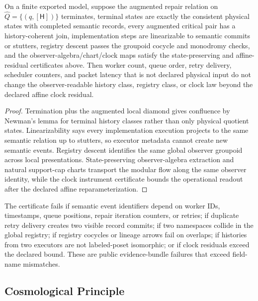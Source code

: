 \begin{theorem}\label{thm:finite-observer-clock-certificate}
On a finite exported model, suppose the augmented repair relation on
\(\widehat Q=\{(q,[\mathsf H])\}\) terminates, terminal states are exactly the consistent physical
states with completed semantic records, every augmented critical pair has a history-coherent join,
implementation steps are linearizable to semantic commits or stutters, registry descent passes the
groupoid cocycle and monodromy checks, and the observer-algebra/chart/clock maps satisfy the
state-preserving and affine-residual certificates above. Then worker count, queue order, retry
delivery, scheduler counters, and packet latency that is not declared physical input do not change
the observer-readable history class, registry class, or clock law beyond the declared affine clock
residual.
\end{theorem}

\begin{proof}
Termination plus the augmented local diamond gives confluence by Newman's lemma for terminal
history classes rather than only physical quotient states. Linearizability says every
implementation execution projects to the same semantic relation up to stutters, so executor
metadata cannot create new semantic events. Registry descent identifies the same global observer
groupoid across local presentations. State-preserving observer-algebra extraction and natural
support-cap charts transport the modular flow along the same observer identity, while the clock
instrument certificate bounds the operational readout after the declared affine reparameterization.
\end{proof}

\begin{remark}[Falsifiers]\label{rem:observer-clock-falsifiers}
The certificate fails if semantic event identifiers depend on worker IDs, timestamps, queue
positions, repair iteration counters, or retries; if duplicate retry delivery creates two visible
record commits; if two namespaces collide in the global registry; if registry cocycles or lineage
arrows fail on overlaps; if histories from two executors are not labeled-poset isomorphic; or if
clock residuals exceed the declared bound. These are public evidence-bundle failures that exceed
field-name mismatches.
\end{remark}

\subsection{Cosmological Principle}


